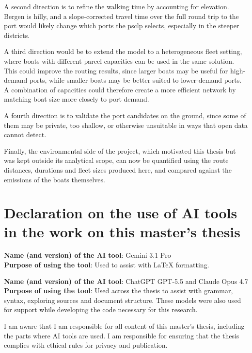 \documentclass[12pt]{article}
\begin{document}
A second direction is to refine the walking time by accounting for elevation. Bergen is hilly, and a slope-corrected travel time over the full round trip to the port would likely change which ports the \ac{psclp} selects, especially in the steeper districts.

A third direction would be to extend the model to a heterogeneous fleet setting, where boats with different parcel capacities can be used in the same solution. This could improve the routing results, since larger boats may be useful for high-demand ports, while smaller boats may be better suited to lower-demand ports. A combination of capacities could therefore create a more efficient network by matching boat size more closely to port demand.

A fourth direction is to validate the port candidates on the ground, since some of them may be private, too shallow, or otherwise unsuitable in ways that open data cannot detect.

Finally, the environmental side of the project, which motivated this thesis but was kept outside its analytical scope, can now be quantified using the route distances, durations and fleet sizes produced here, and compared against the emissions of the boats themselves.

\clearpage
\printbibliography
\appendix

\section*{Declaration on the use of AI tools in the work on this master's thesis}

\noindent \textbf{Name (and version) of the AI tool}: Gemini 3.1 Pro \\
\textbf{Purpose of using the tool}: Used to assist with LaTeX formatting.

\vspace{1em}

\noindent \textbf{Name (and version) of the AI tool}: ChatGPT GPT-5.5 and Claude Opus 4.7 \\
\textbf{Purpose of using the tool}: Used across the thesis to assist with grammar, syntax, exploring sources and document structure. These models were also used for support while developing the code necessary for this research.

\vspace{1em}

\noindent  I am aware that I am responsible for all content of this master's thesis, including the parts where AI tools are used. I am responsible for ensuring that the thesis complies with ethical rules for privacy and publication.
\end{document}
